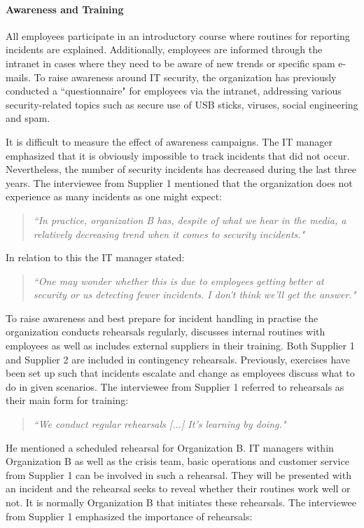 \documentclass[b5paper, twoside, openright, 11pt]{report}
\begin{document}
\paragraph{Awareness and Training}
All employees participate in an introductory course where routines for reporting incidents are explained. Additionally, employees are informed through the intranet in cases where they need to be aware of new trends or specific spam e-mails. To raise awareness around IT security, the organization has previously conducted a ``questionnaire" for employees via the intranet, addressing various security-related topics such as secure use of USB sticks, viruses, social engineering and spam. 

It is difficult to measure the effect of awareness campaigns. The IT manager emphasized that it is obviously impossible to track incidents that did not occur. Nevertheless, the number of security incidents has decreased during the last three years. The interviewee from Supplier 1 mentioned that the organization does not experience as many incidents as one might expect: 

\begin{quote}
\textit{``In practice, organization B has, despite of what we hear in the media, a relatively decreasing trend when it comes to security incidents."}
\end{quote} 

In relation to this the IT manager stated:

\begin{quote}
\textit{``One may wonder whether this is due to employees getting better at security or us detecting fewer incidents. I don't think we'll get the answer."}
\end{quote}
 
To raise awareness and best prepare for incident handling in practise the organization conducts rehearsals regularly, discusses internal routines with employees as well as includes external suppliers in their training. Both Supplier 1 and Supplier 2 are included in contingency rehearsals. Previously, exercises have been set up such that incidents escalate and change as employees discuss what to do in given scenarios. The interviewee from Supplier 1 referred to rehearsals as their main form for training:

\begin{quote}
\textit{``We conduct regular rehearsals [...] It's learning by doing."}
\end{quote}

He mentioned a scheduled rehearsal for Organization B. IT managers within Organization B as well as the crisis team, basic operations and customer service from Supplier 1 can be involved in such a rehearsal. They will be presented with an incident and the rehearsal seeks to reveal whether their routines work well or not. It is normally Organization B that initiates these rehearsals. The interviewee from Supplier 1 emphasized the importance of rehearsals:
\end{document}
